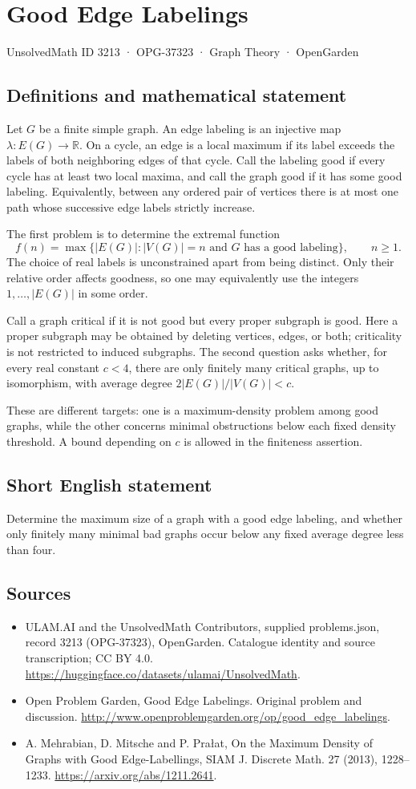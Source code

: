 \documentclass[11pt,a4paper]{article}
\begin{document}
\section*{Good Edge Labelings}\label{3213}
{\small UnsolvedMath ID 3213 · OPG-37323 · Graph Theory · OpenGarden}
\subsection{Definitions and mathematical statement}
Let $G$ be a finite simple graph. An edge labeling is an injective map $\lambda:E(G)\to\mathbb R$. On a cycle, an edge is a local maximum if its label exceeds the labels of both neighboring edges of that cycle. Call the labeling good if every cycle has at least two local maxima, and call the graph good if it has some good labeling. Equivalently, between any ordered pair of vertices there is at most one path whose successive edge labels strictly increase.

The first problem is to determine the extremal function
\[
 f(n)=\max\{|E(G)|:|V(G)|=n\text{ and }G\text{ has a good labeling}\},
 \qquad n\ge1.
\]
The choice of real labels is unconstrained apart from being distinct. Only their relative order affects goodness, so one may equivalently use the integers $1,\ldots,|E(G)|$ in some order.

Call a graph critical if it is not good but every proper subgraph is good. Here a proper subgraph may be obtained by deleting vertices, edges, or both; criticality is not restricted to induced subgraphs. The second question asks whether, for every real constant $c<4$, there are only finitely many critical graphs, up to isomorphism, with average degree $2|E(G)|/|V(G)|<c$.

These are different targets: one is a maximum-density problem among good graphs, while the other concerns minimal obstructions below each fixed density threshold. A bound depending on $c$ is allowed in the finiteness assertion.
\subsection{Short English statement}
Determine the maximum size of a graph with a good edge labeling, and whether only finitely many minimal bad graphs occur below any fixed average degree less than four.
\subsection{Sources}
\begin{itemize}
\item[S1] ULAM.AI and the UnsolvedMath Contributors, supplied problems.json, record 3213 (OPG-37323), OpenGarden. Catalogue identity and source transcription; CC BY 4.0.
\url{https://huggingface.co/datasets/ulamai/UnsolvedMath}.
\item[S2] Open Problem Garden, Good Edge Labelings. Original problem and discussion.
\url{http://www.openproblemgarden.org/op/good_edge_labelings}.
\item[S3] A. Mehrabian, D. Mitsche and P. Prałat, On the Maximum Density of Graphs with Good Edge-Labellings, SIAM J. Discrete Math. 27 (2013), 1228--1233.
\url{https://arxiv.org/abs/1211.2641}.
\end{itemize}
\end{document}
